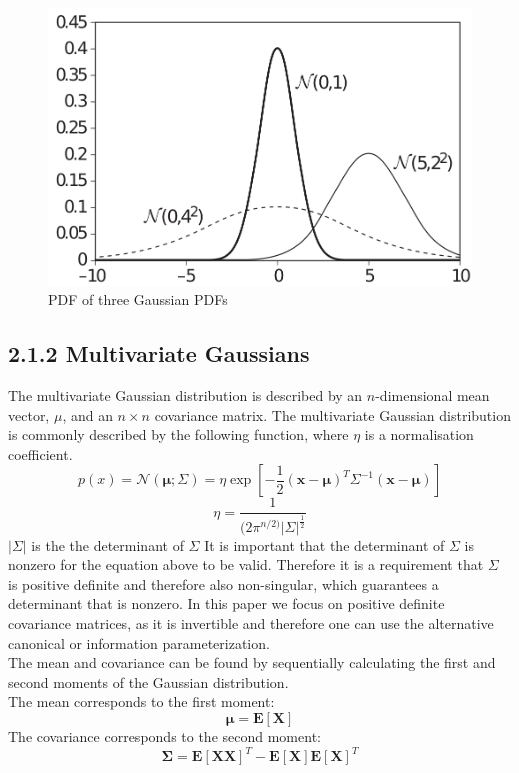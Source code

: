 \documentclass[12pt,oneside,openany,a4paper, %
afrikaans,english,
]{memoir}
\numberwithin{equation}{chapter}
\begin{document}
\begin{figure}[H]
  \includegraphics[width=0.7\linewidth]{Figures/PDF_3_Gaussian_Distributions.png}
  \centering
  \caption{PDF of three Gaussian PDFs}
  \label{fig:gPDF1}
\end{figure}

\subsection{2.1.2 Multivariate Gaussians}
The multivariate Gaussian distribution is described by an $n$-dimensional mean vector, $\mu$, and an $n\times n$ covariance matrix. The multivariate Gaussian distribution is commonly described by the following function, where $\eta$ is a normalisation coefficient.
\begin{equation}\label{eq:3}
p(x) = \mathcal{N}(\bm{\mu};\Sigma) = \eta\exp\left[-\frac{1}{2}(\bm{x}-\bm{\mu})^T\Sigma^{-1}(\bm{x}-\bm{\mu})\right]
\end{equation}
\begin{equation}\label{eq:4}
\eta = \frac{1}{(2\pi^{n/2)}|\Sigma|^{\frac{1}{2}}}
\end{equation}
$|\Sigma|$ is the the determinant of $\Sigma$
It is important that the determinant of $\Sigma$ is nonzero for the equation above to be valid. Therefore it is a requirement that $\Sigma$ is positive definite and therefore also non-singular, which guarantees a  determinant that is nonzero. In this paper we focus on positive definite covariance matrices, as it is invertible and therefore one can use the alternative canonical or information parameterization.\\
The mean and covariance can be found by sequentially calculating the first and second moments of the Gaussian distribution.\\
The mean corresponds to the first moment:
\begin{equation}
\bm{\mu} = \bm{E}\left[\bm{X}\right]
\end{equation}
The covariance corresponds to the second moment:
\begin{equation}
\bm{\Sigma} = \bm{E}[\bm{XX}]^T - \bm{E}[\bm{X}]\bm{E}[\bm{X}]^T
\end{equation}
\end{document}
